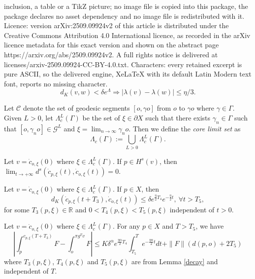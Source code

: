 \documentclass[10pt,a4paper]{amsart}
\def\C{\Gamma}
\def\L{\Lambda}
\def\RR{{\mathbb R}}
\def\a{\alpha}
\def\c{\gamma}   \def\C{\Gamma}
\def\d{\delta}   %
\def\p{{\partial}}
\newcommand{\CCC}{\mathcal{C}}
\newcommand{\GGG}{\mathcal{G}}
\begin{document}
inclusion, a table or a TikZ picture; no image file is copied into this package, the package declares no asset dependency and no image file is redistributed with it. Licence: version arXiv:2509.09924v2 of this article is distributed under the Creative Commons Attribution 4.0 International licence, as recorded in the arXiv licence metadata for this exact version and shown on the abstract page https://arxiv.org/abs/2509.09924v2. A full rights notice is delivered at licenses/arxiv-2509.09924-CC-BY-4.0.txt. Characters: every retained excerpt is pure ASCII, so the delivered engine, XeLaTeX with its default Latin Modern text font, reports no missing character.
\begin{equation}\label{smalldelta}
d_K(v,w)< \delta e^\Lambda \Rightarrow |\lambda(v)-\lambda(w)|\le \eta/3.    
\end{equation}

\begin{definition}\label{corelimit}
Let $\CCC$ denote the set of geodesic segments $[o,\c o]$ from $o$ to $\c o$ where $\c\in \C$. Given $L>0$, let $\L_c^L(\C)$ be the set of $\xi\in \p X$ such that there exists $\c_n\in \C$ such that $[o,\c_no]\in \GGG^L$ and $\xi=\lim_{n\to \infty}\c_no.$
Then we define the \emph{core limit set} as
$$\L_c(\C):=\bigcup_{L>0}\L_c^L(\C).$$
\end{definition}

\begin{lemma}\label{limitzero}
Let $v=\dot{c}_{o,\xi}(0)$ where $\xi\in \L_c^L(\C)$. If $p\in H^s(v)$, then $\lim_{t\to +\infty}d^s(\dot c_{p,\xi}(t), \dot c_{o,\xi}(t))=0$.
\end{lemma}

\begin{lemma}\label{decay}
Let $v=\dot{c}_{o,\xi}(0)$ where $\xi\in \L_c^L(\C)$. If $p\in X$, then 
$$d_K(\dot c_{p,\xi}(t+T_3), \dot c_{o,\xi}(t))\le \d e^{\frac{\eta}{2}T_4}e^{-\frac{\eta}{2}t}, \ \forall t>T_5,$$
for some $T_3(p,\xi)\in \RR$ and $0<T_4(p,\xi) <T_5(p,\xi)$ independent of $t>0$.
\end{lemma}

\begin{lemma}\label{Bowen1}
Let $v=\dot{c}_{o,\xi}(0)$ where $\xi\in \L_c^L(\C)$. For any $p\in X$ and $T>T_5$, we have
$$\left|\int_p^{c_{p,\xi}(T+T_3)}F-\int_{o}^{\pi g^Tv}F\right|\le K\d^\a e^{\frac{\eta\a}{2}T_4}\int_{T_5}^{T}e^{-\frac{\eta\a}{2}t}dt+\|F\|(d(p,o)+2T_5)$$
where $T_3(p,\xi)$, $T_4(p,\xi)$ and $T_5(p,\xi)$ are from Lemma \ref{decay} and independent of $T$.
\end{lemma}
\end{document}

